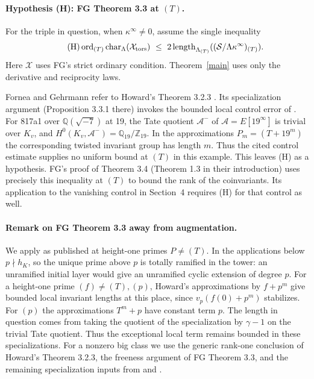 \documentclass[11pt]{article}
\newcommand{\Q}{\mathbb Q}
\newcommand{\Z}{\mathbb Z}
\begin{document}
\paragraph{Hypothesis (H): FG Theorem 3.3 at $(T)$.}
For the triple in question, when $\kappa^\infty\ne0$, assume the single inequality
\[
 \tag{H}\operatorname{ord}_{(T)}\operatorname{char}_\Lambda(\mathcal X_{\rm tors})
 \ \le\ 2\operatorname{length}_{\Lambda_{(T)}}((\mathcal S/\Lambda\kappa^\infty)_{(T)}).
\]
Here $\mathcal X$ uses FG's strict ordinary condition. Theorem~\ref{main} uses only the derivative and reciprocity laws.

Fornea and Gehrmann refer to Howard's Theorem 3.2.3 \cite{How06}. Its specialization argument (Proposition 3.3.1 there) invokes the bounded local control error of \cite[Lemma 2.2.7]{How04}. For 817a1 over $\Q(\sqrt{-7})$ at 19, the Tate quotient $\mathcal A^-$ of $\mathcal A=E[19^\infty]$ is trivial over $K_v$, and $H^0(K_v,\mathcal A^-)=\Q_{19}/\Z_{19}$. In the approximations $P_m=(T+19^m)$ the corresponding twisted invariant group has length $m$. Thus the cited control estimate supplies no uniform bound at $(T)$ in this example. This leaves (H) as a hypothesis. FG's proof of Theorem 3.4 (Theorem 1.3 in their introduction) uses precisely this inequality at $(T)$ to bound the rank of the coinvariants. Its application to the vanishing control in Section~4 requires (H) for that control as well.

\paragraph{Remark on FG Theorem 3.3 away from augmentation.}
We apply \cite[Theorem 3.3]{FG} as published at height-one primes $P\ne(T)$. In the applications below $p\nmid h_K$, so the unique prime above $p$ is totally ramified in the tower: an unramified initial layer would give an unramified cyclic extension of degree $p$. For a height-one prime $(f)\ne(T),(p)$, Howard's approximations by $f+p^m$ give bounded local invariant lengths at this place, since $v_p(f(0)+p^m)$ stabilizes. For $(p)$ the approximations $T^m+p$ have constant term $p$. The length in question comes from taking the quotient of the specialization by $\gamma-1$ on the trivial Tate quotient. Thus the exceptional local term remains bounded in these specializations. For a nonzero big class we use the generic rank-one conclusion of Howard's Theorem 3.2.3, the freeness argument of FG Theorem 3.3, and the remaining specialization inputs from \cite[Theorem 3.2.3 and Proposition 3.3.1]{How06} and \cite[Theorem 3.3]{FG}.
\end{document}
